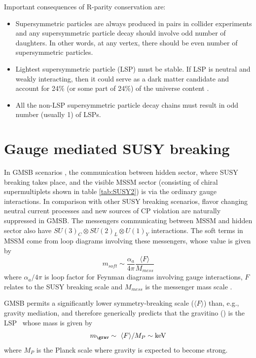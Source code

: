Important consequences \cite{Martin:1997ns} of R-parity conservation are:
\begin{itemize}
\item Supersymmetric particles are always produced in pairs in collider experiments
and any supersymmetric particle decay should involve odd number of daughters.
In other words, at any vertex, there should be even number of supersymmetric particles.
\item Lightest supersymmetric particle (LSP) must be stable. If LSP is neutral and weakly interacting, then it could serve as a dark matter 
candidate and account for 24\% (or some part of 24\%) of the universe content \cite{ELLIS1984453}.
\item All the non-LSP supersymmetric particle decay chains must result in odd number (usually 1) of LSPs.
\end{itemize}

\section{Gauge mediated SUSY breaking}
\label{sec:gmsb}
In GMSB scenarios \cite{Dine:1993yw,Dine:1994vc,Dine:1995ag,Meade:2008wd,Giudice:1998bp,Grajek:2013ola}, the communication between hidden 
sector, where SUSY breaking takes place, and the visible MSSM sector (consisting of chiral supermultiplets shown in table \ref{tab:SUSY2}) 
is via the ordinary gauge interactions. In comparison with other SUSY breaking scenarios, flavor changing neutral current processes and new sources of CP 
violation are naturally suppressed \cite{Dine:1993yw} in GMSB. The messengers communicating between MSSM and hidden sector also have 
$SU(3)_C \otimes SU(2)_L \otimes U(1)_Y$ interactions. The soft terms in MSSM come from loop diagrams involving these messengers, whose 
value is given by
\begin{equation}
m_{soft} \sim \frac{\alpha_{a}}{4\pi} \frac{\langle F \rangle}{M_{mess}}
\end{equation}
where $\alpha_{a}/{4\pi}$ is loop factor for Feynman diagrams involving gauge interactions, $F$ relates to the SUSY breaking scale and 
$M_{mess}$ is the messenger mass scale \cite{Martin:1997ns}.

GMSB permits a significantly lower symmetry-breaking scale ($\langle F\rangle$) than, e.g., gravity mediation, and therefore generically 
predicts that the gravitino () is the LSP~\cite{Meade:2008wd,PhysRevLett.38.1433,CREMMER1978231} whose mass is given by
\begin{equation}
\label{massGrav}
m_{\grav}  \sim \ \langle F \rangle/M_P \sim \mathrm{keV}
\end{equation}
where $M_P$ is the Planck scale where gravity is expected to become strong.

